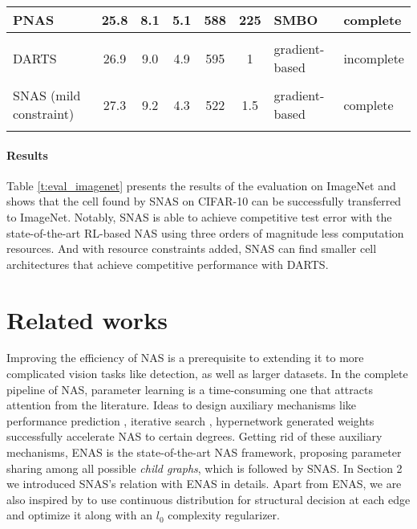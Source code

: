 \documentclass{article} \usepackage{iclr2019_conference,times}
\newcommand{\zh}{\color{black}}
\begin{document}
\begin{table}[t]
\begin{center}
{\begin{tabular}{lcccccll}
PNAS \citep{liu2017progressive}   &25.8  &8.1  &5.1 &588  &225   &SMBO &complete
\vspace{0.1cm}
\\ \hline \vspace{-0.2cm}\\
DARTS \citep{liu2018darts}   &26.9 &9.0  &4.9  &595   &1  &gradient-based  &incomplete
\vspace{0.1cm}
\\ \hline \vspace{-0.2cm}\\
SNAS (mild constraint)   &27.3  &9.2  &4.3     &522     &1.5  &gradient-based   &complete
\vspace{0.1cm}
\\ \hline
\vspace{-0.5cm}
\end{tabular}}
\end{center}
\end{table}

\paragraph{Results}

Table \ref{t:eval_imagenet} presents the results of the evaluation on ImageNet and shows that the cell found by SNAS on CIFAR-10 can be successfully transferred to ImageNet. Notably, SNAS is able to achieve competitive test error with the state-of-the-art RL-based NAS using three orders of magnitude less computation resources. And with resource constraints added, SNAS can find smaller cell architectures that achieve competitive performance with DARTS.

\section{Related works}
Improving the efficiency of NAS is a prerequisite to {\zh extending} it to more complicated vision tasks like detection, as well as larger datasets. In the complete pipeline of NAS, parameter learning is a time-consuming one that attracts attention from the literature. Ideas to design auxiliary mechanisms like performance prediction \citep{baker2017accelerating, deng2017peephole}, iterative search \citep{liu2017progressive}, hypernetwork generated weights \citep{brock2017smash} successfully accelerate NAS to certain degrees. Getting rid of these auxiliary mechanism{\zh s}, ENAS \citep{pham2018efficient} is the state-of-the-art NAS framework, proposing parameter sharing among all possible \textit{child graphs}, which is followed by SNAS. In Section 2 we introduced SNAS's relation with ENAS in details. Apart {\zh from} ENAS, we are also inspired by \citet{louizos2017learning} to use continuous distribution for structural decision at each edge and optimize it along with an $l_{0}$ complexity regularizer.
\end{document}
